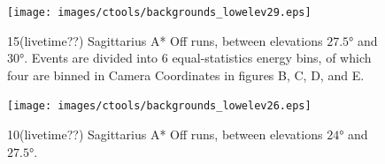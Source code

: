 \begin{figure}[ht]
  \begin{center}
    \texttt{[image: images/ctools/backgrounds\_lowelev29.eps]}
    \caption[CTOOLS Background at 29 degrees Elevation]{15(livetime??) Sagittarius A* Off runs, between elevations $ \ang{27.5} $ and $ \ang{30} $.  Events are divided into 6 equal-statistics energy bins, of which four are binned in Camera Coordinates in figures B, C, D, and E.}\label{fig:back_lowelev29}
  \end{center}
\end{figure}

\begin{figure}[ht]
  \begin{center}
    \texttt{[image: images/ctools/backgrounds\_lowelev26.eps]}
    \caption[CTOOLS Background at 26 degrees Elevation]{10(livetime??) Sagittarius A* Off runs, between elevations $ \ang{24} $ and $ \ang{27.5} $. }\label{fig:back_lowelev26}
  \end{center}
\end{figure}






